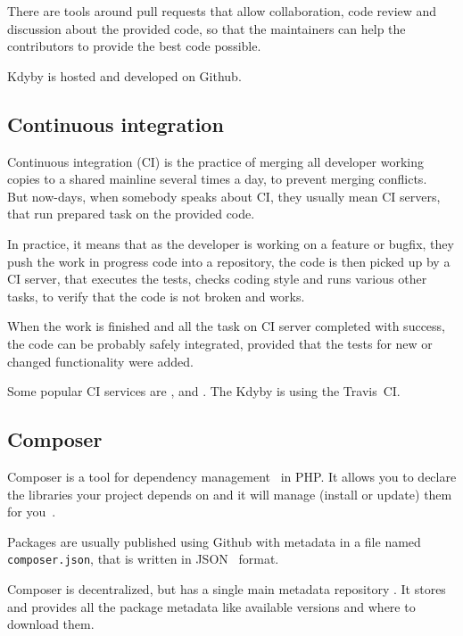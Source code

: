 There are tools around pull requests that allow collaboration, code review and discussion about the provided code, so that the maintainers can help the contributors to provide the best code possible.

Kdyby is hosted and developed on Github.

\subsection{Continuous integration} \label{sec:theory:ci}

Continuous integration (CI) is the practice of merging all developer working copies to a shared mainline several times a day, to prevent merging conflicts.~\cite{wiki:ci} But now-days, when somebody speaks about CI, they usually mean CI servers, that run prepared task on the provided code.

In practice, it means that as the developer is working on a feature or bugfix, they push the work in progress code into a repository, the code is then picked up by a CI server, that executes the tests, checks coding style and runs various other tasks, to verify that the code is not broken and works.

When the work is finished and all the task on CI server completed with success, the code can be probably safely integrated, provided that the tests for new or changed functionality were added.

Some popular CI services are ,  and . The Kdyby is using the Travis~CI.

\subsection{Composer} \label{sec:theory:composer}

Composer is a tool for dependency management~\cite{wiki:package-manager} in PHP. It allows you to declare the libraries your project depends on and it will manage (install or update) them for you~\cite{composer:docs:intro}.

Packages are usually published using Github with metadata in a file named \lstinline{composer.json}, that is written in JSON~\cite{wiki:json} format.

Composer is decentralized, but has a single main metadata repository . It stores and provides all the package metadata like available versions and where to download them.

